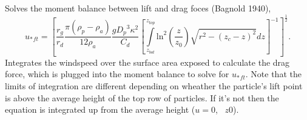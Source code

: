 \documentclass{article}
\begin{document}
\begin{itemize}
	Solves the moment balance between lift and drag foces (Bagnold 1940),
	\begin{equation}
	{u_{*}}_{ft} = \left[ \frac{r_g}{r_d}\frac{\pi (\rho_p - \rho_a)}{12 \rho_a}\frac{g{D_p}^3 \kappa^2}{C_d} \left[\int\limits_{z_{bot}}^{z_{top}} {\text{ln}}^2 \left(\frac{z}{z_0}\right) \sqrt{r^2 - {(z_c-z)}^2} dz\right]^{-1}\right]^{\frac{1}{2}}.
    \end{equation}
    Integrates the windspeed over the surface area exposed to calculate the drag force, which is plugged into the moment balance to solve for ${u_*}_{ft}$. Note that the limits of integration are different depending on wheather the particle's lift point is above the average height of the top row of particles. If it's not then the equation is integrated up from the average height ($u = 0$, ~$z0$).
	 
\end{itemize}
\end{document}
